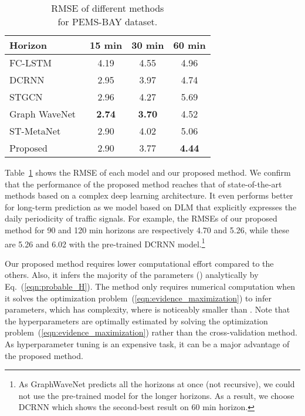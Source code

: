 \documentclass[journal]{IEEEtran}
\begin{document}
\begin{table}[t!]
\caption{RMSE of different methods\\for PEMS-BAY dataset.}
\label{table:rmse_methods}
\centering
\begin{tabular}{lccc}
\toprule
Horizon &    15 min&    30 min&    60 min\\
\midrule
FC-LSTM~\cite{hochreiter1997long}        &   4.19 &  4.55 &  4.96\\
DCRNN~\cite{li2018diffusion}        &  2.95 &  3.97 &  4.74 \\
STGCN~\cite{yao2018deep}        &  2.96 &  4.27 &  5.69\\
Graph WaveNet~\cite{xu2018graph} &  {\bf{2.74}} &  {\bf{3.70}} &  4.52 \\
ST-MetaNet~\cite{pan2019urban}        &  2.90 &  4.02 &  5.06 \\
Proposed       &  2.90 &  3.77 &  {\bf{4.44}} \\
\bottomrule
\end{tabular}
\end{table}

Table~\ref{table:rmse_methods} shows the RMSE of each model and our proposed method.
We confirm that the performance of the proposed method reaches that of state-of-the-art methods based on a complex deep learning architecture. It even performs better for long-term prediction as we model based on DLM that explicitly expresses the daily periodicity of traffic signals.
For example, the RMSEs of our proposed method for 90 and 120 min horizons are respectively 4.70 and 5.26, while these are 5.26 and 6.02 with the pre-trained DCRNN model.\footnote{As GraphWaveNet predicts all the horizons at once (not recursive), we could not use the pre-trained model for the longer horizons. As a result, we choose DCRNN which shows the second-best result on 60 min horizon.}

Our proposed method requires lower computational effort compared to the others.
Also, it infers the majority of the parameters () analytically by Eq.~(\ref{eqn:probable_H}).
The method only requires numerical computation when it solves the optimization problem~(\ref{eqn:evidence_maximization}) to infer  parameters, which has  complexity, where  is noticeably smaller than .
Note that the hyperparameters are optimally estimated by solving the optimization problem~(\ref{eqn:evidence_maximization}) rather than the cross-validation method. As hyperparameter tuning is an expensive task, it can be a major advantage of the proposed method.
\end{document}
